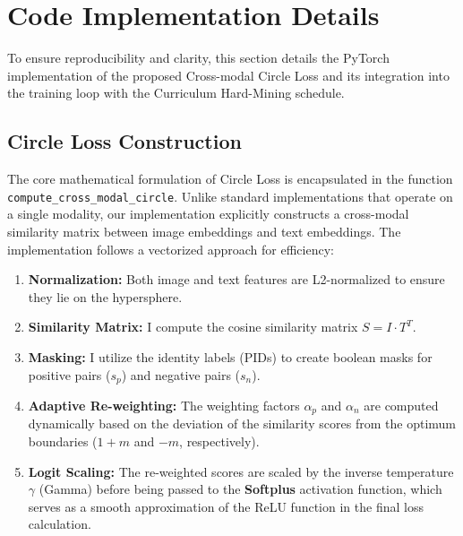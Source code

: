 \documentclass[../main.tex]{subfiles}
\begin{document}
\section{Code Implementation Details}
To ensure reproducibility and clarity, this section details the PyTorch implementation of the proposed Cross-modal Circle Loss and its integration into the training loop with the Curriculum Hard-Mining schedule.

\subsection{Circle Loss Construction}
\noindent The core mathematical formulation of Circle Loss is encapsulated in the function \texttt{compute\_cross\_modal\_circle}. Unlike standard implementations that operate on a single modality, our implementation explicitly constructs a cross-modal similarity matrix between image embeddings and text embeddings. The implementation follows a vectorized approach for efficiency:

\begin{enumerate}[itemsep=0.5em, topsep=0.5em]
    \item \textbf{Normalization:} Both image and text features are L2-normalized to ensure they lie on the hypersphere.
    \item \textbf{Similarity Matrix:} I compute the cosine similarity matrix $S = I \cdot T^T$.
    \item \textbf{Masking:} I utilize the identity labels (PIDs) to create boolean masks for positive pairs ($s_p$) and negative pairs ($s_n$).
    \item \textbf{Adaptive Re-weighting:} The weighting factors $\alpha_p$ and $\alpha_n$ are computed dynamically based on the deviation of the similarity scores from the optimum boundaries ($1+m$ and $-m$, respectively).
    \item \textbf{Logit Scaling:} The re-weighted scores are scaled by the inverse temperature $\gamma$ (Gamma) before being passed to the \textbf{Softplus} activation function, which serves as a smooth approximation of the ReLU function in the final loss calculation.
\end{enumerate}
\end{document}
